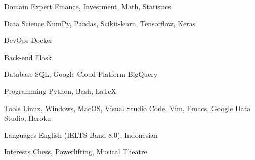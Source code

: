 

\begin{cvskills}

  \cvskill
    {Domain Expert} %
    {Finance, Investment, Math, Statistics} %

  \cvskill
    {Data Science} %
    {NumPy, Pandas, Scikit-learn, Tensorflow, Keras} %

  \cvskill
    {DevOps} %
    {Docker} %

  \cvskill
    {Back-end} %
    {Flask} %

  \cvskill
    {Database} %
    {SQL, Google Cloud Platform BigQuery} %

  \cvskill
    {Programming} %
    {Python, Bash, LaTeX} %

  \cvskill
    {Tools} %
    {Linux, Windows, MacOS, Visual Studio Code, Vim, Emacs, Google Data Studio, Heroku} %

  \cvskill
    {Languages} %
    {English (IELTS Band 8.0), Indonesian} %

  \cvskill
    {Interests} %
    {Chess, Powerlifting, Musical Theatre} %

\end{cvskills}
